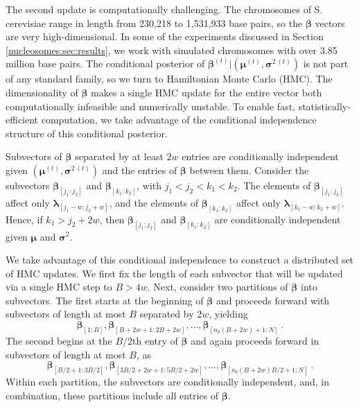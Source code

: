 The second update is computationally challenging.
The chromosomes of S. cerevisiae range in length from 230,218 to 1,531,933 base pairs, so the $\bm \beta$ vectors are very high-dimensional.
In some of the experiments discussed in Section \ref{nucleosomes:sec:results}, we work with simulated chromosomes with over 3.85 million base pairs.
The conditional posterior of $\bm \beta^{(t)} | (\bm \mu^{(t)}, \bm \sigma^{2\,(t)})$ is not part of any standard family, so we turn to Hamiltonian Monte Carlo (HMC).
The dimensionality of $\bm \beta$ makes a single HMC update for the entire vector both computationally infeasible and numerically unstable.
To enable fast, statistically-efficient computation, we take advantage of the conditional independence structure of this conditional posterior.

Subvectors of $\bm \beta$ separated by at least $2w$ entries are conditionally independent given $(\bm \mu^{(t)}, \bm \sigma^{2\,(t)})$ and the entries of $\bm \beta$ between them.
Consider the subvectors $\bm \beta_{[j_1 : j_2]}$ and $\bm \beta_{[k_1 : k_2]}$, with $j_1 < j_2 < k_1 < k_2$.
The elements of $\bm \beta_{[j_1 : j_2]}$ affect only $\bm \lambda_{[j_1 - w : j_2 + w]}$, and the elements of $\bm \beta_{[k_1 : k_2]}$ affect only $\bm \lambda_{[k_1 - w : k_2 + w]}$.
Hence, if $k_1 > j_2 + 2w$, then $\bm \beta_{[j_1 : j_2]}$ and $\bm \beta_{[k_1 : k_2]}$ are conditionally independent given $\bm \mu$ and $\bm \sigma^2$.

We take advantage of this conditional independence to construct a distributed set of HMC updates.
We first fix the length of each subvector that will be updated via a single HMC step to $B > 4w$.
Next, consider two partitions of $\bm \beta$ into subvectors.
The first starts at the beginning of $\bm \beta$ and proceeds forward with subvectors of length at most $B$ separated by $2w$, yielding
$$\bm \beta_{[1 : B]}, \bm \beta_{[B + 2w + 1 : 2B + 2w]}, \ldots, \bm \beta_{[n_b (B + 2w) + 1 : N]} \ .$$
The second begins at the $B/2$th entry of $\bm \beta$ and again proceeds forward in subvectors of length at most $B$, as
$$\bm \beta_{[B/2 + 1 : 3B/2]}, \bm \beta_{[3B/2 + 2w + 1 : 5B/2 + 2w]}, \ldots, \bm \beta_{[n_b (B + 2w) B/2 + 1 : N]} \ .$$
Within each partition, the subvectors are conditionally independent, and, in combination, these partitions include all entries of $\bm \beta$.

